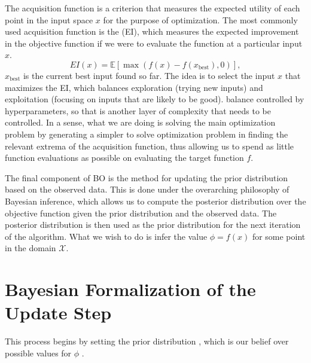 The acquisition function is a criterion that measures the expected utility of each point in the input space $x$ for the purpose of optimization. The most commonly used acquisition function is the  (EI), which measures the expected improvement in the objective function if we were to evaluate the function at a particular input $x$.
\[ EI(x) = \mathbb{E}[\max(f(x) - f(x_{\text{best}}), 0)], \]
 $x_{\text{best}}$ is the current best input found so far. The idea is to select the input $x$ that maximizes the EI, which balances exploration (trying new inputs) and exploitation (focusing on inputs that are likely to be good).  balance  controlled by hyperparameters, so that is another layer of complexity that needs to be controlled. In a sense, what we are doing is  solving the main optimization problem by generating a simpler to solve optimization problem in finding the relevant extrema of the acquisition function, thus allowing us to spend as little function evaluations as possible on evaluating the target function $f$. 

The final component of BO is the method for updating the prior distribution based on the observed data. This is done under the overarching philosophy of Bayesian inference, which allows us to compute the posterior distribution over the objective function given the prior distribution and the observed data. The posterior distribution is then used as the prior distribution for the next iteration of the algorithm. What we wish to do is infer the value $\phi = f(x)$ for some  point in the domain $\mathcal{X}$.

\section{Bayesian Formalization of the Update Step}


This process begins by setting the prior distribution , which is our belief over possible values for $\phi$ .

